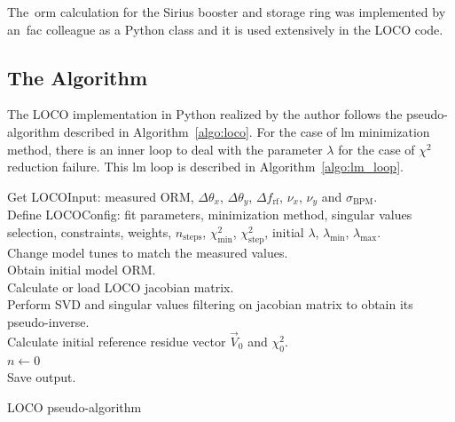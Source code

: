 The~\gls{orm} calculation for the Sirius booster and storage ring was implemented by an~\gls{fac} colleague as a Python class and it is used extensively in the LOCO code.
\subsection{The Algorithm}
The LOCO implementation in Python realized by the author follows the pseudo-algorithm described in Algorithm~\ref{algo:loco}. For the case of \gls{lm} minimization method, there is an inner loop to deal with the parameter $\lambda$ for the case of $\chi^2$ reduction failure. This \gls{lm} loop is described in Algorithm~\ref{algo:lm_loop}.
\begin{algorithm}[h!]
\scriptsize
\footnotesize
\SetAlgoLined
{}
 Get LOCOInput: measured ORM, $\Delta \theta_x$, $\Delta \theta_y$, $\Delta f_{\mathrm{rf}}$, $\nu_x$, $\nu_y$ and $\sigma_{\mathrm{BPM}}$.\\
 Define LOCOConfig: fit parameters, minimization method, singular values selection, constraints, weights, $n_{\mathrm{steps}}$, $\chi^2_{\mathrm{min}}$, $\chi^2_{\mathrm{step}}$, initial $\lambda$, $\lambda_{\mathrm{min}}$, $\lambda_{\mathrm{max}}$.\\
 Change model tunes to match the measured values.\\
 Obtain initial model ORM.\\
 Calculate or load LOCO jacobian matrix.\\
 Perform SVD and singular values filtering on jacobian matrix to obtain its pseudo-inverse.\\
 Calculate initial reference residue vector $\vec{V}_0$ and $\chi^2_0$.\\
 $n \leftarrow 0$ \\
 Save output.
 \caption{LOCO pseudo-algorithm}
 \label{algo:loco}
\end{algorithm}
